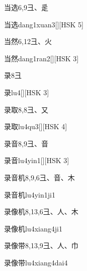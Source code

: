 \begin{entry}{当选}{6,9}{⼹、⾡}
  \begin{phonetics}{当选}{dang1xuan3}[][HSK 5]
  \end{phonetics}
\end{entry}

\begin{entry}{当然}{6,12}{⼹、⽕}
  \begin{phonetics}{当然}{dang1ran2}[][HSK 3]
  \end{phonetics}
\end{entry}

\begin{entry}{录}{8}{⼹}
  \begin{phonetics}{录}{lu4}[][HSK 3]
  \end{phonetics}
\end{entry}

\begin{entry}{录取}{8,8}{⼹、⼜}
  \begin{phonetics}{录取}{lu4qu3}[][HSK 4]
  \end{phonetics}
\end{entry}

\begin{entry}{录音}{8,9}{⼹、⾳}
  \begin{phonetics}{录音}{lu4yin1}[][HSK 3]
  \end{phonetics}
\end{entry}

\begin{entry}{录音机}{8,9,6}{⼹、⾳、⽊}
  \begin{phonetics}{录音机}{lu4yin1ji1}
  \end{phonetics}
\end{entry}

\begin{entry}{录像机}{8,13,6}{⼹、⼈、⽊}
  \begin{phonetics}{录像机}{lu4xiang4ji1}
  \end{phonetics}
\end{entry}

\begin{entry}{录像带}{8,13,9}{⼹、⼈、⼱}
  \begin{phonetics}{录像带}{lu4xiang4dai4}
  \end{phonetics}
\end{entry}


